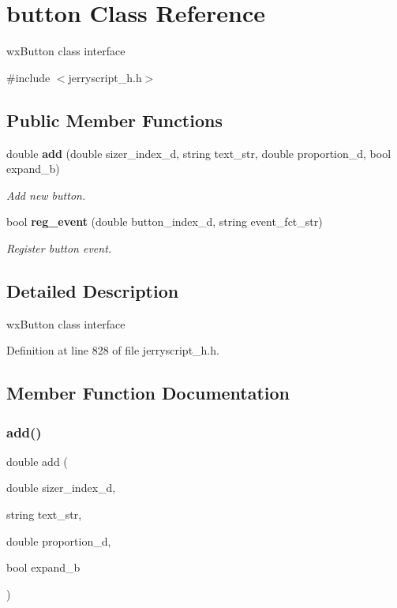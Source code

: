\section{button Class Reference}
\label{classbutton}


wx\+Button class interface  




{\ttfamily \#include $<$jerryscript\+\_\+h.\+h$>$}

\subsection*{Public Member Functions}
\begin{DoxyCompactItemize}
\item 
double \textbf{ add} (double sizer\+\_\+index\+\_\+d, string text\+\_\+str, double proportion\+\_\+d, bool expand\+\_\+b)
\begin{DoxyCompactList}\small\item\em Add new button. \end{DoxyCompactList}\item 
bool \textbf{ reg\+\_\+event} (double button\+\_\+index\+\_\+d, string event\+\_\+fct\+\_\+str)
\begin{DoxyCompactList}\small\item\em Register button event. \end{DoxyCompactList}\end{DoxyCompactItemize}


\subsection{Detailed Description}
wx\+Button class interface 

Definition at line 828 of file jerryscript\+\_\+h.\+h.



\subsection{Member Function Documentation}
\mbox{\label{classbutton_aa718efb3db1aa6e994d4ee0f4b31e024}} 
\subsubsection{add()}
{\footnotesize\ttfamily double add (\begin{DoxyParamCaption}\item[{double}]{sizer\+\_\+index\+\_\+d,  }\item[{string}]{text\+\_\+str,  }\item[{double}]{proportion\+\_\+d,  }\item[{bool}]{expand\+\_\+b }\end{DoxyParamCaption})}



